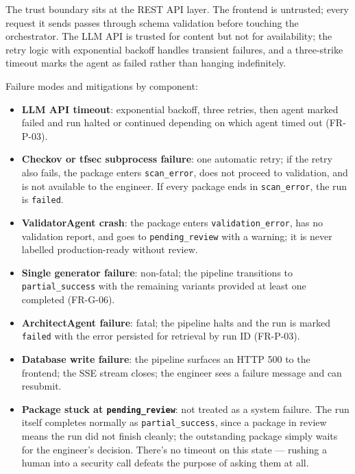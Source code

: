 The trust boundary sits at the REST API layer. The frontend is untrusted;
every request it sends passes through schema validation before touching the
orchestrator. The LLM API is trusted for content but not for availability;
the retry logic with exponential backoff handles transient failures, and a
three-strike timeout marks the agent as failed rather than hanging
indefinitely.

Failure modes and mitigations by component:

\begin{itemize}
  \item \textbf{LLM API timeout}: exponential backoff, three retries, then
    agent marked failed and run halted or continued depending on which agent
    timed out (FR-P-03).
  \item \textbf{Checkov or tfsec subprocess failure}: one automatic retry;
    if the retry also fails, the package enters \texttt{scan\_error}, does
    not proceed to validation, and is not available to the engineer. If
    every package ends in \texttt{scan\_error}, the run is \texttt{failed}.
  \item \textbf{ValidatorAgent crash}: the package enters
    \texttt{validation\_error}, has no validation report, and goes to
    \texttt{pending\_review} with a warning; it is never labelled
    production-ready without review.
  \item \textbf{Single generator failure}: non-fatal; the pipeline transitions
    to \texttt{partial\_success} with the remaining variants provided at least
    one completed (FR-G-06).
  \item \textbf{ArchitectAgent failure}: fatal; the pipeline halts and the
    run is marked \texttt{failed} with the error persisted for retrieval
    by run ID (FR-P-03).
  \item \textbf{Database write failure}: the pipeline surfaces an HTTP 500
    to the frontend; the SSE stream closes; the engineer sees a failure
    message and can resubmit.
  \item \textbf{Package stuck at \texttt{pending\_review}}: not treated as
    a system failure. The run itself completes normally as
    \texttt{partial\_success}, since a package in review means the run did
    not finish cleanly; the outstanding package simply waits for
    the engineer's decision. There's no timeout on this state --- rushing
    a human into a security call defeats the purpose of asking them at all.
\end{itemize}


